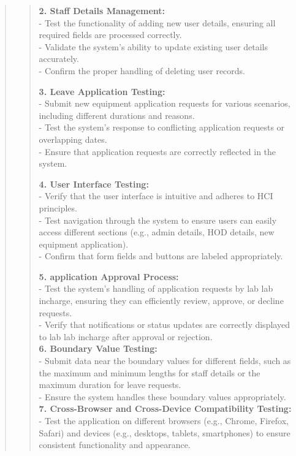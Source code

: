 \documentclass[12pt]{report}
\begin{document}
\begin{quote}
\begin{quote}
			\textbf{2. Staff Details Management:}\\
			- Test the functionality of adding new user details, ensuring all required fields are processed correctly.\\
			- Validate the system's ability to update existing user details accurately.\\
			- Confirm the proper handling of deleting user records.
			
			\textbf{3. Leave Application Testing:}\\
			- Submit new equipment application requests for various scenarios, including different durations and reasons.\\
			- Test the system's response to conflicting application requests or overlapping dates.\\
			- Ensure that application requests are correctly reflected in the system.
			
			\textbf{4. User Interface Testing:}\\
			- Verify that the user interface is intuitive and adheres to HCI principles.\\
			- Test navigation through the system to ensure users can easily access different sections (e.g., admin details, HOD details, new equipment application).\\
			- Confirm that form fields and buttons are labeled appropriately.
			
			\textbf{5. application Approval Process:}\\
			- Test the system's handling of application requests by lab lab incharge, ensuring they can efficiently review, approve, or decline requests.\\
			- Verify that notifications or status updates are correctly displayed to lab lab incharge after approval or rejection.\\
			
			\textbf{6. Boundary Value Testing:}\\
			- Submit data near the boundary values for different fields, such as the maximum and minimum lengths for staff details or the maximum duration for leave requests.\\
			- Ensure the system handles these boundary values appropriately.\\
			
			\textbf{7. Cross-Browser and Cross-Device Compatibility Testing:}\\
			- Test the application on different browsers (e.g., Chrome, Firefox, Safari) and devices (e.g., desktops, tablets, smartphones) to ensure consistent functionality and appearance.\\
			

\end{quote}
\end{quote}
\end{document}
